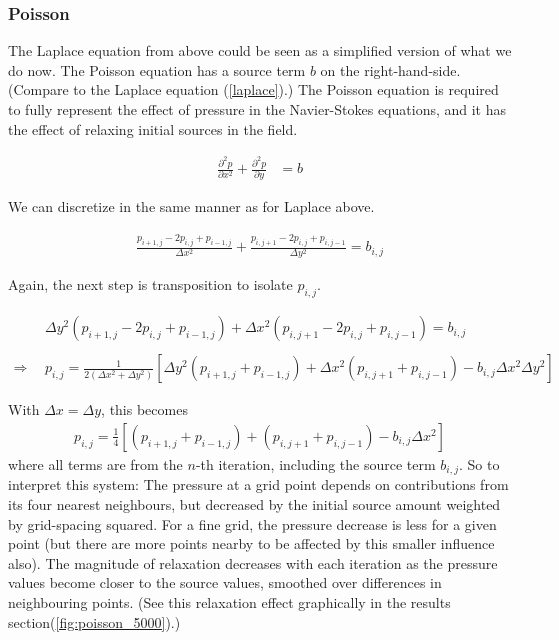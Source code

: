 \documentclass[11pt]{article}
\begin{document}
{\subsubsection{Poisson}
The Laplace equation from above could be seen as a simplified version of what we do now.
The Poisson equation has a source term $b$ on the right-hand-side.
(Compare to the Laplace equation (\ref{laplace}).)
The Poisson equation is required to fully represent the effect of pressure in
the Navier-Stokes equations, and it has the effect of relaxing initial sources in the field.

\begin{align}
\frac{\partial^2 p}{\partial x^2} + \frac{\partial^2 p}{\partial y} &= b
\label{poisson}
\end{align}

We can discretize in the same manner as for Laplace above.

\begin{align}
\frac{p_{i+1,j} - 2p_{i,j} + p_{i-1,j}}{\Delta x^2}
 + \frac{p_{i,j+1} - 2p_{i,j} + p_{i,j-1}}{\Delta y^2} = b_{i,j}
\label{discrete_poisson}
\end{align}

Again, the next step is transposition to isolate $p_{i,j}$.

\begin{align}
&\Delta y^2 (p_{i+1,j} - 2p_{i,j} + p_{i-1,j}) + \Delta x^2 (p_{i,j+1} - 2p_{i,j} + p_{i,j-1})
 = b_{i,j}
	\nonumber \\ \nonumber \\
\Rightarrow ~~&
p_{i,j} = \frac{1}{2(\Delta x^2 + \Delta y^2)}
		 \left[ \Delta y^2(p_{i+1,j} + p_{i-1,j}) + \Delta x^2(p_{i,j+1} + p_{i,j-1})
		 - b_{i,j} \Delta x^2 \Delta y^2 \right]
\end{align}

With $\Delta x = \Delta y$, this becomes
\begin{align}
p_{i,j} = \frac{1}{4}
		 \left[ (p_{i+1,j} + p_{i-1,j}) + (p_{i,j+1} + p_{i,j-1})
		 - b_{i,j} \Delta x^2 \right]
\label{transpoisson}
\end{align}
where all terms are from the $n$-th iteration, including the source term $b_{i,j}$.
So to interpret this system:
The pressure at a grid point depends on contributions from its four nearest
neighbours, but decreased by the initial source amount weighted by grid-spacing squared.
For a fine grid, the pressure decrease is less for a given point (but there are more points
nearby to be affected by this smaller influence also).
The magnitude of relaxation decreases with each iteration as the pressure values become closer
to the source values, smoothed over differences in neighbouring points.
(See this relaxation effect graphically in the results section(\ref{fig:poisson_5000}).)


}
\end{document}
